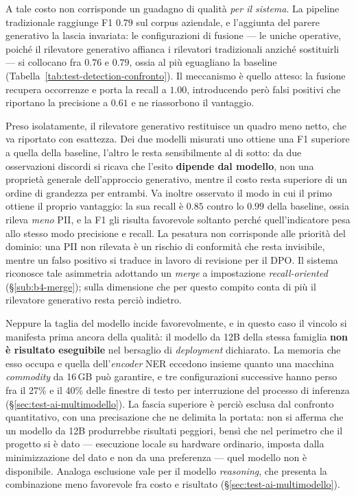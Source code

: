 A tale costo non corrisponde un guadagno di qualità \emph{per il sistema}. La pipeline tradizionale raggiunge F1 $0.79$ sul corpus aziendale, e l'aggiunta del parere generativo la lascia invariata: le configurazioni di fusione --- le uniche operative, poiché il rilevatore generativo affianca i rilevatori tradizionali anziché sostituirli --- si collocano fra $0.76$ e $0.79$, ossia al più eguagliano la baseline (Tabella~\ref{tab:test-detection-confronto}). Il meccanismo è quello atteso: la fusione recupera occorrenze e porta la recall a $1.00$, introducendo però falsi positivi che riportano la precisione a $0.61$ e ne riassorbono il vantaggio.

Preso isolatamente, il rilevatore generativo restituisce un quadro meno netto, che va riportato con esattezza. Dei due modelli misurati uno ottiene una F1 superiore a quella della baseline, l'altro le resta sensibilmente al di sotto: da due osservazioni discordi si ricava che l'esito \textbf{dipende dal modello}, non una proprietà generale dell'approccio generativo, mentre il costo resta superiore di un ordine di grandezza per entrambi. Va inoltre osservato il modo in cui il primo ottiene il proprio vantaggio: la sua recall è $0.85$ contro lo $0.99$ della baseline, ossia rileva \emph{meno} PII, e la F1 gli risulta favorevole soltanto perché quell'indicatore pesa allo stesso modo precisione e recall. La pesatura non corrisponde alle priorità del dominio: una PII non rilevata è un rischio di conformità che resta invisibile, mentre un falso positivo si traduce in lavoro di revisione per il DPO. Il sistema riconosce tale asimmetria adottando un \emph{merge} a impostazione \textit{recall-oriented} (§\ref{sub:b4-merge}); sulla dimensione che per questo compito conta di più il rilevatore generativo resta perciò indietro.

Neppure la taglia del modello incide favorevolmente, e in questo caso il vincolo si manifesta prima ancora della qualità: il modello da 12B della stessa famiglia \textbf{non è risultato eseguibile} nel bersaglio di \textit{deployment} dichiarato. La memoria che esso occupa e quella dell'\textit{encoder} NER eccedono insieme quanto una macchina \textit{commodity} da 16\,GB può garantire, e tre configurazioni successive hanno perso fra il 27\% e il 40\% delle finestre di testo per interruzione del processo di inferenza (§\ref{sec:test-ai-multimodello}). La fascia superiore è perciò esclusa dal confronto quantitativo, con una precisazione che ne delimita la portata: non si afferma che un modello da 12B produrrebbe risultati peggiori, bensì che nel perimetro che il progetto si è dato --- esecuzione locale su hardware ordinario, imposta dalla minimizzazione del dato e non da una preferenza --- quel modello non è disponibile. Analoga esclusione vale per il modello \textit{reasoning}, che presenta la combinazione meno favorevole fra costo e risultato (§\ref{sec:test-ai-multimodello}).

